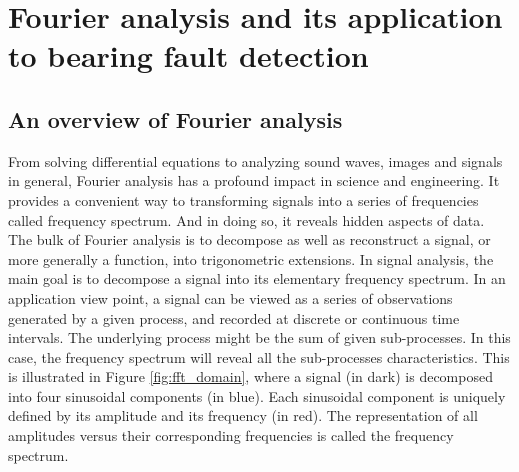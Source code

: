 \documentclass[../Main/thesis.tex]{subfiles}
\begin{document}
\chapter[Fourier analysis and its application to bearing fault detection]{Fourier analysis and its application to bearing fault detection}
\label{sec:chapter2}

\section{An overview of Fourier analysis}
From solving differential equations to analyzing sound waves, images and signals in general, Fourier analysis has a profound impact in science and engineering. It provides a convenient way to transforming signals into a series of frequencies called frequency spectrum. And in doing so, it reveals hidden aspects of data. The bulk of Fourier analysis is to decompose as well as reconstruct a signal, or more generally a function, into trigonometric extensions. In signal analysis, the main goal is to decompose a signal into its elementary frequency spectrum.
\justify
  In an application view point, a signal can be viewed as a series of observations generated by a given process, and recorded at discrete or continuous time intervals. The underlying process might be the sum of given sub-processes. In this case, the frequency spectrum will reveal all the sub-processes characteristics.
This is illustrated in Figure \ref{fig:fft_domain}, where a signal (in dark) is decomposed into four sinusoidal components (in blue). Each sinusoidal component is uniquely defined by its amplitude and its frequency (in red). The representation of all amplitudes versus their corresponding frequencies is called the frequency spectrum.
\end{document}
